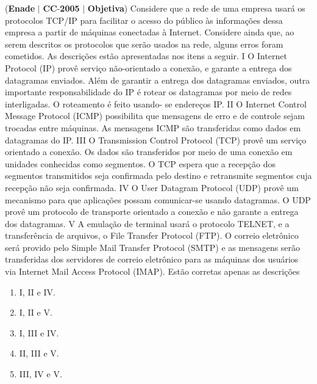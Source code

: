 \documentclass{exam}
\begin{document}
\begin{questions}
\question (\textbf{Enade} $|$ \textbf{CC}-\textbf{2005} $|$ \textbf{Objetiva})
Considere que a rede de uma empresa usará os protocolos
TCP/IP para facilitar o acesso do público às informações dessa
empresa a partir de máquinas conectadas à Internet. Considere
ainda que, ao serem descritos os protocolos que serão usados na
rede, alguns erros foram cometidos. As descrições estão
apresentadas nos itens a seguir.
I O Internet Protocol (IP) provê serviço não-orientado a
conexão, e garante a entrega dos datagramas enviados. Além
de garantir a entrega dos datagramas enviados, outra
importante responsabilidade do IP é rotear os datagramas
por meio de redes interligadas. O roteamento é feito usando-
se endereços IP.
II O Internet Control Message Protocol (ICMP) possibilita
que mensagens de erro e de controle sejam trocadas entre
máquinas. As mensagens ICMP são transferidas como dados
em datagramas do IP.
III O Transmission Control Protocol (TCP) provê um serviço
orientado a conexão. Os dados são transferidos por meio de
uma conexão em unidades conhecidas como segmentos.
O TCP espera que a recepção dos segmentos transmitidos
seja confirmada pelo destino e retransmite segmentos cuja
recepção não seja confirmada.
IV O User Datagram Protocol (UDP) provê um mecanismo
para que aplicações possam comunicar-se usando
datagramas. O UDP provê um protocolo de transporte
orientado a conexão e não garante a entrega dos datagramas.
V A emulação de terminal usará o protocolo TELNET, e a
transferência de arquivos, o File Transfer Protocol (FTP).
O correio eletrônico será provido pelo Simple Mail Transfer
Protocol (SMTP) e as mensagens serão transferidas dos
servidores de correio eletrônico para as máquinas dos
usuários via Internet Mail Access Protocol (IMAP).
Estão corretas apenas as descrições
	\begin{enumerate}[label=\alph*)]
		\item  I, II e IV. 
		\item  I, II e V. 
		\item  I, III e IV.
		\item  II, III e V.
		\item  III, IV e V.
	\end{enumerate}


\end{questions}
\end{document}
